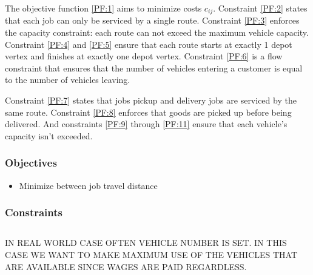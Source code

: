 The objective function \eqref{PF:1} aims to minimize costs $c_{ij}$. Constraint \eqref{PF:2} states that each job can only be serviced by a single route. Constraint \eqref{PF:3} enforces the capacity constraint: each route can not exceed the maximum vehicle capacity. Constraint \eqref{PF:4} and \eqref{PF:5} ensure that each route starts at exactly 1 depot vertex and finishes at exactly one depot vertex. Constraint \eqref{PF:6} is a flow constraint that ensures that the number of vehicles entering a customer is equal to the number of vehicles leaving.

Constraint \eqref{PF:7} states that jobs pickup and delivery jobs are serviced by the same route. Constraint \eqref{PF:8} enforces that goods are picked up before being delivered. And constraints \eqref{PF:9} through \eqref{PF:11} ensure that each vehicle's capacity isn't exceeded.


\subsubsection{Objectives}

\begin{itemize}
	\item Minimize between job travel distance
\end{itemize}

\subsubsection{Constraints}

\subsection{\VRPTW}

\subsection{\PDPTW}


IN REAL WORLD CASE OFTEN VEHICLE NUMBER IS SET. IN THIS CASE WE WANT TO MAKE MAXIMUM USE OF THE VEHICLES THAT ARE AVAILABLE SINCE WAGES ARE PAID REGARDLESS.




